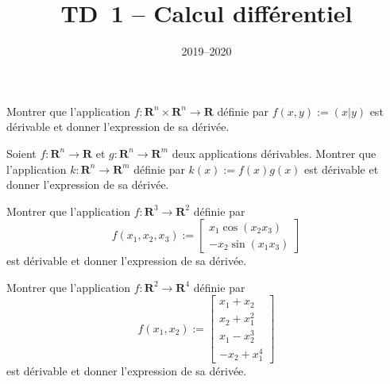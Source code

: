 \documentclass[11pt,a4paper]{article}
\title{TD~1 -- Calcul diff\'erentiel}
\date{2019--2020}
\def\R{\mathbf{R}}
\theoremstyle{plain}
\theoremstyle{definition}
\begin{document}
\maketitle

\begin{Exercice}
\begin{Question} Montrer que l'application $f : \R^n \times \R^n \to \R$ d\'efinie par
$f(x,y):=(x|y)$ est d\'erivable et donner l'expression de sa d\'eriv\'ee.
\end{Question}
\begin{Question} Soient $f : \R^n \to \R$ et $g : \R^n \to \R^m$ deux
applications d\'erivables. 
Montrer que l'application $k : \R^n \to \R^m$ d\'efinie par 
$k(x):=f(x)g(x)$ est d\'erivable et donner l'expression de sa d\'eriv\'ee.
\end{Question}
\end{Exercice}

\begin{Exercice}
\begin{Question} Montrer que l'application $f : \R^3 \to \R^2$ d\'efinie par
\[ f(x_1,x_2,x_3) := \left[ \begin{array}{r} x_1\cos(x_2 x_3)\\-x_2\sin(x_1 x_3) \end{array} \right] \]
est d\'erivable et donner l'expression de sa d\'eriv\'ee.
\end{Question}
\begin{Question} Montrer que l'application $f : \R^2 \to \R^4$ d\'efinie par
\[ f(x_1,x_2) := \left[ \begin{array}{r} x_1+x_2\\ x_2+x_1^2\\ x_1-x_2^3\\-x_2+x_1^4 \end{array} \right] \]
est d\'erivable et donner l'expression de sa d\'eriv\'ee.
\end{Question}
\end{Exercice}
\end{document}
